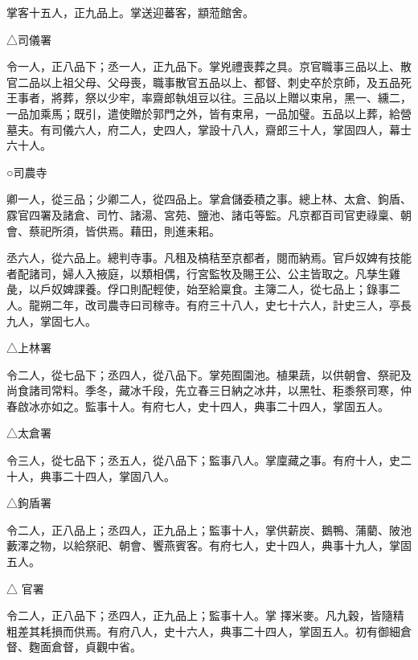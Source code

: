 \begin{pinyinscope}
 掌客十五人，正九品上。掌送迎蕃客，顓蒞館舍。



 △司儀署



 令一人，正八品下；丞一人，正九品下。掌兇禮喪葬之具。京官職事三品以上、散官二品以上祖父母、父母喪，職事散官五品以上、都督、刺史卒於京師，及五品死王事者，將葬，祭以少牢，率齋郎執俎豆以往。三品以上贈以束帛，黑一、纁二，一品加乘馬；既引，遣使贈於郭門之外，皆有束帛，一品加璧。五品以上葬，給營墓夫。有司儀六人，府二人，史四人，掌設十八人，齋郎三十人，掌固四人，幕士六十人。



 ○司農寺



 卿一人，從三品；少卿二人，從四品上。掌倉儲委積之事。總上林、太倉、鉤盾、霡官四署及諸倉、司竹、諸湯、宮苑、鹽池、諸屯等監。凡京都百司官吏祿稟、朝會、蔡祀所須，皆供焉。藉田，則進耒耜。



 丞六人，從六品上。總判寺事。凡租及槁秸至京都者，閱而納焉。官戶奴婢有技能者配諸司，婦人入掖庭，以類相偶，行宮監牧及賜王公、公主皆取之。凡孳生雞彘，以戶奴婢課養。俘口則配輕使，始至給稟食。主簿二人，從七品上；錄事二人。龍朔二年，改司農寺曰司稼寺。有府三十八人，史七十六人，計史三人，亭長九人，掌固七人。



 △上林署



 令二人，從七品下；丞四人，從八品下。掌苑囿園池。植果蔬，以供朝會、祭祀及尚食諸司常料。季冬，藏冰千段，先立春三日納之冰井，以黑牡、秬黍祭司寒，仲春啟冰亦如之。監事十人。有府七人，史十四人，典事二十四人，掌固五人。



 △太倉署



 令三人，從七品下；丞五人，從八品下；監事八人。掌廩藏之事。有府十人，史二十人，典事二十四人，掌固八人。



 △鉤盾署



 令二人，正八品上；丞四人，正九品上；監事十人，掌供薪炭、鵝鴨、蒲藺、陂池藪澤之物，以給祭祀、朝會、饗燕賓客。有府七人，史十四人，典事十九人，掌固五人。


△
 官署


令二人，正八品下；丞四人，正九品上；監事十人。掌
 擇米麥。凡九穀，皆隨精粗差其耗損而供焉。有府八人，史十六人，典事二十四人，掌固五人。初有御細倉督、麴面倉督，貞觀中省。




\end{pinyinscope}
